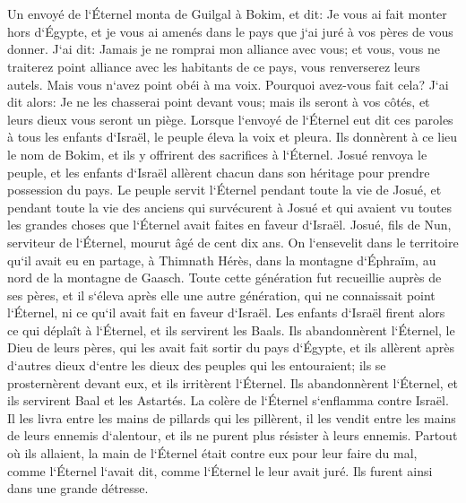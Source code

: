 \chapter{}

\verse Un envoyé de l`Éternel monta de Guilgal à Bokim, et dit: Je vous ai fait monter hors d`Égypte, et je vous ai amenés dans le pays que j`ai juré à vos pères de vous donner. J`ai dit: Jamais je ne romprai mon alliance avec vous; 
\verse et vous, vous ne traiterez point alliance avec les habitants de ce pays, vous renverserez leurs autels. Mais vous n`avez point obéi à ma voix. Pourquoi avez-vous fait cela? 
\verse J`ai dit alors: Je ne les chasserai point devant vous; mais ils seront à vos côtés, et leurs dieux vous seront un piège. 
\verse Lorsque l`envoyé de l`Éternel eut dit ces paroles à tous les enfants d`Israël, le peuple éleva la voix et pleura. 
\verse Ils donnèrent à ce lieu le nom de Bokim, et ils y offrirent des sacrifices à l`Éternel. 
\verse Josué renvoya le peuple, et les enfants d`Israël allèrent chacun dans son héritage pour prendre possession du pays. 
\verse Le peuple servit l`Éternel pendant toute la vie de Josué, et pendant toute la vie des anciens qui survécurent à Josué et qui avaient vu toutes les grandes choses que l`Éternel avait faites en faveur d`Israël. 
\verse Josué, fils de Nun, serviteur de l`Éternel, mourut âgé de cent dix ans. 
\verse On l`ensevelit dans le territoire qu`il avait eu en partage, à Thimnath Hérès, dans la montagne d`Éphraïm, au nord de la montagne de Gaasch. 
\verse Toute cette génération fut recueillie auprès de ses pères, et il s`éleva après elle une autre génération, qui ne connaissait point l`Éternel, ni ce qu`il avait fait en faveur d`Israël. 
\verse Les enfants d`Israël firent alors ce qui déplaît à l`Éternel, et ils servirent les Baals. 
\verse Ils abandonnèrent l`Éternel, le Dieu de leurs pères, qui les avait fait sortir du pays d`Égypte, et ils allèrent après d`autres dieux d`entre les dieux des peuples qui les entouraient; ils se prosternèrent devant eux, et ils irritèrent l`Éternel. 
\verse Ils abandonnèrent l`Éternel, et ils servirent Baal et les Astartés. 
\verse La colère de l`Éternel s`enflamma contre Israël. Il les livra entre les mains de pillards qui les pillèrent, il les vendit entre les mains de leurs ennemis d`alentour, et ils ne purent plus résister à leurs ennemis. 
\verse Partout où ils allaient, la main de l`Éternel était contre eux pour leur faire du mal, comme l`Éternel l`avait dit, comme l`Éternel le leur avait juré. Ils furent ainsi dans une grande détresse. 
